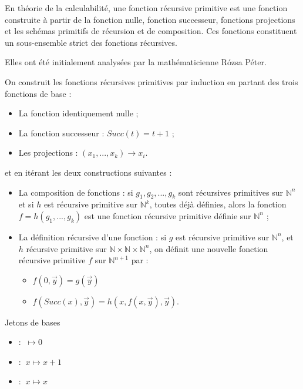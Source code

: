 \begin{definition}
En théorie de la calculabilité, une fonction récursive primitive est une fonction construite à partir de la fonction nulle, fonction successeur, fonctions projections et les schémas primitifs de récursion et de composition. Ces fonctions constituent un sous-ensemble strict des fonctions récursives.
\par Elles ont été initialement analysées par la mathématicienne Rózsa Péter.
\par On construit les fonctions récursives primitives par induction en partant des trois fonctions de base :
\begin{itemize}
	\item La fonction identiquement nulle ;
	\item La fonction successeur : $Succ(t)=t+1$ ;
	\item Les projections : $(x_{1},...,x_{k})\rightarrow x_{i}$.
\end{itemize}
et en itérant les deux constructions suivantes :
\begin{itemize}
	\item La composition de fonctions : 
si $g_{1}, g_{2}, ..., g_{k}$ sont récursives primitives sur $\mathbb {N} ^{n}$ 
et si $h$ est récursive primitive sur $\mathbb {N} ^{k}$, toutes déjà définies,
alors la fonction $f=h(g_{1},...,g_{k})$ est une fonction récursive primitive définie sur $\mathbb {N} ^{n}$ ;

	\item La définition récursive d'une fonction : 
si $g$ est récursive primitive sur $\mathbb {N} ^{n}$, et $h$ récursive primitive sur ${\mathbb  N}\times {\mathbb  N}\times {\mathbb  N}^{n}$, on définit une nouvelle fonction récursive primitive $f$ sur ${\mathbb  N}^{{n+1}}$ par :
	\begin{itemize}
		\item $f(0,\vec y) = g(\vec y)$
		\item $ f(Succ(x),\vec y) = h(x,f(x,\vec y),\vec y)$.
	\end{itemize}
\end{itemize}
\end{definition}

\begin{definition}{Jetons de bases}
\begin{itemize}
\item \Zero : $~ \mapsto 0$
\item \Successor : $~x \mapsto x+1$
\item \Identity : $~x \mapsto x$
\end{itemize}
\end{definition}

